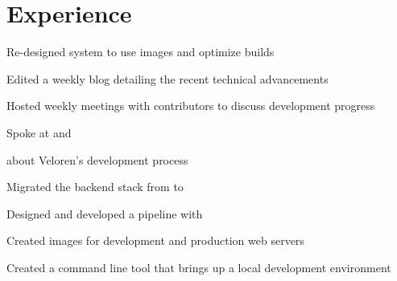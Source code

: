 \documentclass[]{deedy-resume-openfont}
\begin{document}
\begin{minipage}[t]{0.66\textwidth}


\section{Experience}

\begin{tightemize}

\item Re-designed system to use images and optimize builds

\item Edited a weekly blog detailing the recent technical advancements

\item Hosted weekly meetings with contributors to discuss development progress

\item Spoke at \href{https://www.youtube.com/watch?v=aS26sqT09Pw}{}\href{https://www.youtube.com/watch?v=76FPpOnshNw}{}and 

\item \href{https://www.gamingonlinux.com/2020/06/interviewed-veloren-an-upcoming-foss-multiplayer-voxel-rpg}{}about Veloren's development process

\end{tightemize}
\sectionsep
{}
\begin{tightemize}

\item Migrated the backend stack from to 

\item Designed and developed a  pipeline with 

\item Created images for development and production web servers

\item Created a command line tool that brings up a local development environment


\end{tightemize}
\end{minipage}
\end{document}
